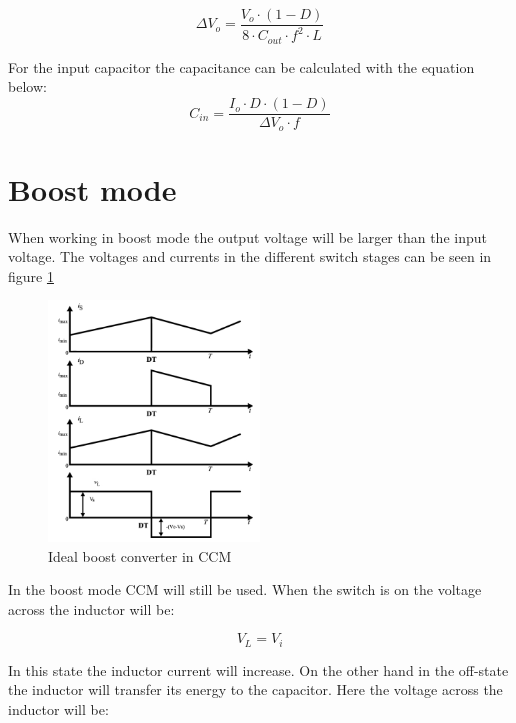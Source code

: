 \begin{equation} \label{buckc} 
\Delta V_o = \frac{V_{o}\cdot (1-D)}{8\cdot C_{out}\cdot f^2\cdot L}
\end{equation}  \cite{buck_equation}    

For the input capacitor the capacitance can be calculated with the equation below:
\begin{equation}
\label{buckcin}
C_{in} = \frac{I_o\cdot D\cdot (1-D)}{\Delta V_o\cdot f}
\end{equation} \cite{underthehood}  

\section{Boost mode}
When working in boost mode the output voltage will be larger than the input voltage. The voltages and currents in the different switch stages can be seen in figure \ref{CCM_boost}

\begin{figure}[H]
	\begin{center}
		\includegraphics[width=0.5\textwidth]{../Pictures/CCM_boost}
		\caption{Ideal boost converter in CCM \cite{CCM_boost}}
		\label{CCM_boost}
	\end{center}	
\end{figure}
In the boost mode CCM will still be used. When the switch is on the voltage across the inductor will be:

\begin{equation}
V_L = V_i
\end{equation}

In this state the inductor current will increase. On the other hand in the off-state the inductor will transfer its energy to the capacitor. Here the voltage across the inductor will be:

